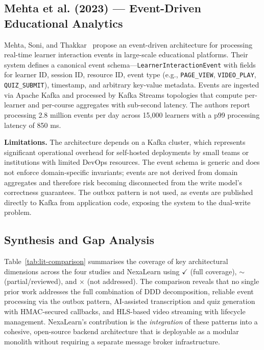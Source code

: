 \subsection{Mehta et al. (2023) --- Event-Driven Educational Analytics}

Mehta, Soni, and Thakkar~\cite{mehta2023eda} propose an event-driven architecture for processing real-time learner interaction events in large-scale educational platforms. Their system defines a canonical event schema---\texttt{LearnerInteractionEvent} with fields for learner ID, session ID, resource ID, event type (e.g., \texttt{PAGE\_VIEW}, \texttt{VIDEO\_PLAY}, \texttt{QUIZ\_SUBMIT}), timestamp, and arbitrary key-value metadata. Events are ingested via Apache Kafka and processed by Kafka Streams topologies that compute per-learner and per-course aggregates with sub-second latency. The authors report processing 2.8 million events per day across 15,000 learners with a p99 processing latency of 850 ms.

\textbf{Limitations.} The architecture depends on a Kafka cluster, which represents significant operational overhead for self-hosted deployments by small teams or institutions with limited DevOps resources. The event schema is generic and does not enforce domain-specific invariants; events are not derived from domain aggregates and therefore risk becoming disconnected from the write model's correctness guarantees. The outbox pattern is not used, as events are published directly to Kafka from application code, exposing the system to the dual-write problem.

\subsection{Synthesis and Gap Analysis}

Table~\ref{tab:lit-comparison} summarises the coverage of key architectural dimensions across the four studies and NexaLearn using $\checkmark$ (full coverage), $\sim$ (partial/reviewed), and $\times$ (not addressed). The comparison reveals that no single prior work addresses the full combination of DDD decomposition, reliable event processing via the outbox pattern, AI-assisted transcription and quiz generation with HMAC-secured callbacks, and HLS-based video streaming with lifecycle management. NexaLearn's contribution is the \textit{integration} of these patterns into a cohesive, open-source backend architecture that is deployable as a modular monolith without requiring a separate message broker infrastructure.

